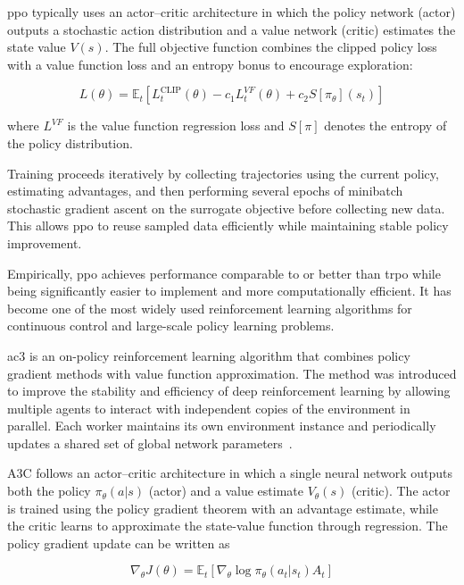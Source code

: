 \gls{ppo} typically uses an actor–critic architecture in which the policy network (actor) outputs a stochastic action distribution and a value network (critic) estimates the state value $V(s)$.
The full objective function combines the clipped policy loss with a value function loss and an entropy bonus to encourage exploration:

\begin{equation} \label{eq:ppo4}
L(\theta) =
\mathbb{E}_t
\left[
L^{\text{CLIP}}_t(\theta)
- c_1 L^{VF}_t(\theta)
+ c_2 S[\pi_\theta](s_t)
\right]
\end{equation}

where $L^{VF}$ is the value function regression loss and $S[\pi]$ denotes the entropy of the policy distribution.

Training proceeds iteratively by collecting trajectories using the current policy, estimating advantages, and then performing several epochs of minibatch stochastic gradient ascent on the surrogate objective before collecting new data.
This allows \gls{ppo} to reuse sampled data efficiently while maintaining stable policy improvement.

Empirically, \gls{ppo} achieves performance comparable to or better than \gls{trpo} while being significantly easier to implement and more computationally efficient.
It has become one of the most widely used reinforcement learning algorithms for continuous control and large-scale policy learning problems.

\gls{ac3} is an on-policy reinforcement learning algorithm that combines policy gradient methods with value function approximation.
The method was introduced to improve the stability and efficiency of deep reinforcement learning by allowing multiple agents to interact with independent copies of the environment in parallel.
Each worker maintains its own environment instance and periodically updates a shared set of global network parameters~\cite{mnih2016}.

A3C follows an actor–critic architecture in which a single neural network outputs both the policy $\pi_\theta(a|s)$ (actor) and a value estimate $V_\theta(s)$ (critic).
The actor is trained using the policy gradient theorem with an advantage estimate, while the critic learns to approximate the state-value function through regression.
The policy gradient update can be written as

\begin{equation} \label{eq:ac31}
\nabla_\theta J(\theta) =
\mathbb{E}_t
\left[
\nabla_\theta \log \pi_\theta(a_t|s_t) A_t
\right]
\end{equation}

